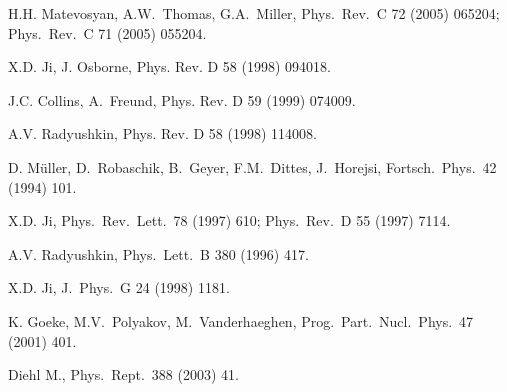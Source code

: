 \begin{thebibliography}{PPV06}
  H.H. Matevosyan, A.W.~Thomas, G.A.~Miller,
  Phys.\ Rev.\ C  72 (2005) 065204;
  Phys.\ Rev.\ C  71 (2005) 055204.


X.D. Ji, J. Osborne,
Phys. Rev. D  58 (1998) 094018.

J.C. Collins, A.~Freund,
Phys. Rev. D  59 (1999) 074009.

A.V. Radyushkin,
Phys. Rev. D  58 (1998) 114008.

D. M\"uller, D.~Robaschik, B.~Geyer, F.M.~Dittes, J.~Horejsi,
Fortsch.\ Phys.\  42 (1994) 101.

X.D. Ji,
Phys.\ Rev.\ Lett.\   78 (1997) 610;
Phys.\ Rev.\ D  55 (1997) 7114.


  A.V. Radyushkin,
  Phys.\ Lett.\ B  380 (1996) 417.


  X.D. Ji,
  J.\ Phys.\ G  24 (1998) 1181.

K. Goeke, M.V.~Polyakov, M.~Vanderhaeghen,
Prog.\ Part.\ Nucl.\ Phys.\   47 (2001) 401.

  Diehl M.,
  Phys.\ Rept.\   388  (2003) 41.


\end{thebibliography}
